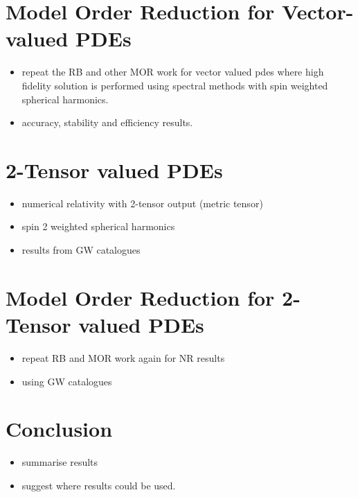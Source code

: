 \chapter{Model Order Reduction for Vector-valued PDEs}
\begin{itemize}
\item repeat the RB and other MOR work for vector valued pdes where high fidelity solution is performed using spectral methods with spin weighted spherical harmonics.
\item accuracy, stability and efficiency results.
\end{itemize}

\chapter{2-Tensor valued PDEs}
\begin{itemize}
\item numerical relativity with 2-tensor output (metric tensor)
\item spin 2 weighted spherical harmonics
\item results from GW catalogues
\end{itemize}

\chapter{Model Order Reduction for 2-Tensor valued PDEs}
\begin{itemize}
\item repeat RB and MOR work again for NR results
\item using GW catalogues
\end{itemize}

\chapter{Conclusion}
\begin{itemize}
\item summarise results
\item suggest where results could be used.
\end{itemize}



%
%

 